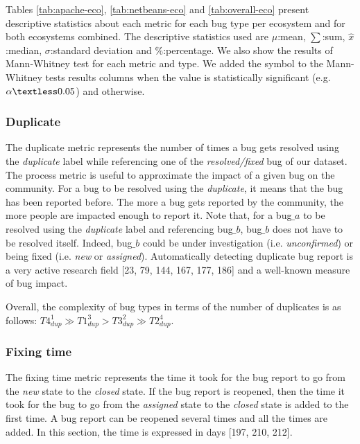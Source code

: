 \documentclass[12pt]{report}
\newcommand{\xmark}{\ding{55}}%
\begin{document}
Tables \ref{tab:apache-eco}, \ref{tab:netbeans-eco} and
\ref{tab:overall-eco} present descriptive statistics about each metric
for each bug type per ecosystem and for both ecosystems combined. The
descriptive statistics used are \(\mu\):mean, \(\sum\):sum,
\(\hat{x}\):median, \(\sigma\):standard deviation and \(\%\):percentage.
We also show the results of Mann-Whitney test for each metric and type.
We added the \checkmark symbol to the Mann-Whitney tests results columns
when the value is statistically significant (e.g.
\(\alpha \textless 0.05\)) and \xmark otherwise.

 


\subsubsection{Duplicate}\label{duplicate}

The duplicate metric represents the number of times a bug gets resolved
using the \emph{duplicate} label while referencing one of the
\emph{resolved/fixed} bug of our dataset. The process metric is useful
to approximate the impact of a given bug on the community. For a bug to
be resolved using the \emph{duplicate}, it means that the bug has been
reported before. The more a bug gets reported by the community, the more
people are impacted enough to report it. Note that, for a bug\(\_a\) to
be resolved using the \emph{duplicate} label and referencing bug\(\_b\),
bug\(\_b\) does not have to be resolved itself. Indeed, bug\(\_b\) could
be under investigation (i.e. \emph{unconfirmed}) or being fixed (i.e.
\emph{new} or \emph{assigned}). Automatically detecting duplicate bug
report is a very active research field {[}23, 79, 144, 167, 177, 186{]}
and a well-known measure of bug impact.

Overall, the complexity of bug types in terms of the number of
duplicates is as follows:
\(T4_{dup}^{1} \gg T1_{dup}^{3} > T3_{dup}^{2} \gg T2_{dup}^{4}\).

\subsubsection{Fixing time}\label{fixing-time}

The fixing time metric represents the time it took for the bug report to
go from the \emph{new} state to the \emph{closed} state. If the bug
report is reopened, then the time it took for the bug to go from the
\emph{assigned} state to the \emph{closed} state is added to the first
time. A bug report can be reopened several times and all the times are
added. In this section, the time is expressed in days {[}197, 210,
212{]}.
\end{document}
